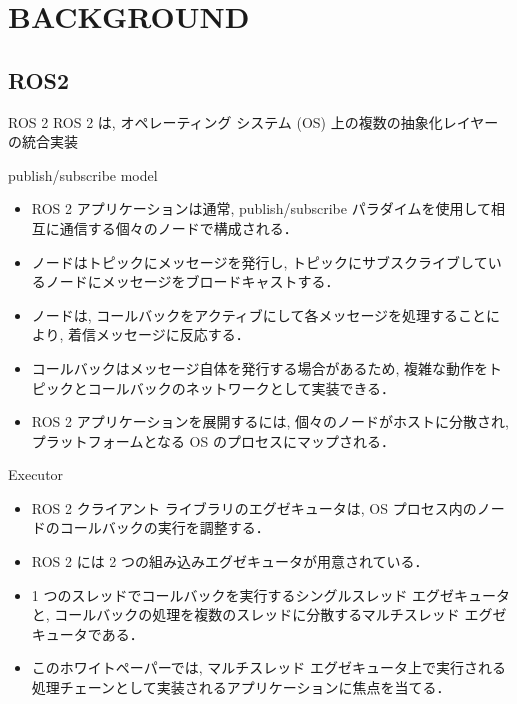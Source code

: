 

\section{BACKGROUND}
\label{sec: background}


\subsection{ROS2}
\label{ssec: ros2}

\begin{frame}{ROS 2}
    ROS 2 は, オペレーティング システム (OS) 上の複数の抽象化レイヤーの統合実装

    \centering
\end{frame}

\begin{frame}{publish/subscribe model}
    \begin{itemize}
        \item ROS 2 アプリケーションは通常, publish/subscribe パラダイムを使用して相互に通信する個々のノードで構成される．
        \item ノードはトピックにメッセージを発行し, トピックにサブスクライブしているノードにメッセージをブロードキャストする．
        \item ノードは, コールバックをアクティブにして各メッセージを処理することにより, 着信メッセージに反応する．
        \item コールバックはメッセージ自体を発行する場合があるため, 複雑な動作をトピックとコールバックのネットワークとして実装できる．
        \item ROS 2 アプリケーションを展開するには, 個々のノードがホストに分散され, プラットフォームとなる OS のプロセスにマップされる．
    \end{itemize}
\end{frame}

\begin{frame}{Executor}
    \begin{itemize}
        \item ROS 2 クライアント ライブラリのエグゼキュータは, OS プロセス内のノードのコールバックの実行を調整する．
        \item ROS 2 には 2 つの組み込みエグゼキュータが用意されている．
        \item 1 つのスレッドでコールバックを実行するシングルスレッド エグゼキュータと, コールバックの処理を複数のスレッドに分散するマルチスレッド エグゼキュータである．
        \item このホワイトペーパーでは, マルチスレッド エグゼキュータ上で実行される処理チェーンとして実装されるアプリケーションに焦点を当てる．
    \end{itemize}
\end{frame}

